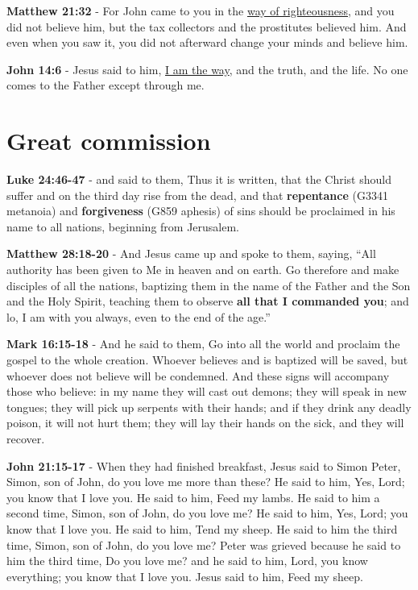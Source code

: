 \documentclass[11pt]{article}
\begin{document}
\textbf{Matthew 21:32} - For John came to you in the \uline{way of righteousness}, and you did not believe him, but the tax collectors and the prostitutes believed him. And even when you saw it, you did not afterward change your minds and believe him.

\textbf{John 14:6} - Jesus said to him, \uline{I am the way}, and the truth, and the life. No one comes to the Father except through me.

\section{Great commission}
\label{sec:org64efe1a}
\textbf{Luke 24:46-47} - and said to them, Thus it is written, that the Christ should suffer and on the third day rise from the dead, and that \textbf{repentance} (G3341 metanoia) and \textbf{forgiveness} (G859 aphesis) of sins should be proclaimed in his name to all nations, beginning from Jerusalem.

\textbf{Matthew 28:18-20} - And Jesus came up and spoke to them, saying, “All authority has been given to Me in heaven and on earth. Go therefore and make disciples of all the nations, baptizing them in the name of the Father and the Son and the Holy Spirit, teaching them to observe \textbf{all that I commanded you}; and lo, I am with you always, even to the end of the age.”

\textbf{Mark 16:15-18} - And he said to them, Go into all the world and proclaim the gospel to the whole creation. Whoever believes and is baptized will be saved, but whoever does not believe will be condemned. And these signs will accompany those who believe: in my name they will cast out demons; they will speak in new tongues; they will pick up serpents with their hands; and if they drink any deadly poison, it will not hurt them; they will lay their hands on the sick, and they will recover.

\textbf{John 21:15-17} - When they had finished breakfast, Jesus said to Simon Peter, Simon, son of John, do you love me more than these? He said to him, Yes, Lord; you know that I love you. He said to him, Feed my lambs. He said to him a second time, Simon, son of John, do you love me? He said to him, Yes, Lord; you know that I love you. He said to him, Tend my sheep. He said to him the third time, Simon, son of John, do you love me? Peter was grieved because he said to him the third time, Do you love me? and he said to him, Lord, you know everything; you know that I love you. Jesus said to him, Feed my sheep.
\end{document}
